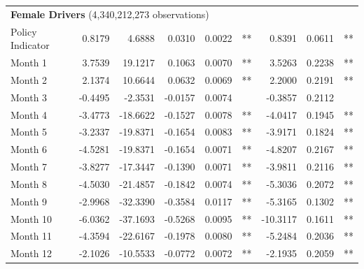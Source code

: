 \documentclass{cje}
\begin{document}
\begin{table}
\begin{tabular}{l r r r r l r r l}
\hline 

\multicolumn{7}{l}{\textbf{Female Drivers} (4,340,212,273 observations)} \\ 

Policy Indicator          &  0.8179        &  4.6888       &  0.0310        &  0.0022       &   **       &  0.8391        &  0.0611       &   **       \\ 
Month 1                         &  3.7539        &  19.1217       &  0.1063        &  0.0070       &   **       &  3.5263        &  0.2238       &   **       \\ 
Month 2                         &  2.1374        &  10.6644       &  0.0632        &  0.0069       &   **       &  2.2000        &  0.2191       &   **       \\ 
Month 3                         &  -0.4495        &  -2.3531       &  -0.0157        &  0.0074       &            &  -0.3857        &  0.2112       &            \\ 
Month 4                         &  -3.4773        &  -18.6622       &  -0.1527        &  0.0078       &   **       &  -4.0417        &  0.1945       &   **       \\ 
Month 5                         &  -3.2337        &  -19.8371       &  -0.1654        &  0.0083       &   **       &  -3.9171        &  0.1824       &   **       \\ 
Month 6                         &  -4.5281        &  -19.8371       &  -0.1654        &  0.0071       &   **       &  -4.8207        &  0.2167       &   **       \\ 
Month 7                         &  -3.8277        &  -17.3447       &  -0.1390        &  0.0071       &   **       &  -3.9811        &  0.2116       &   **       \\ 
Month 8                         &  -4.5030        &  -21.4857       &  -0.1842        &  0.0074       &   **       &  -5.3036        &  0.2072       &   **       \\ 
Month 9                         &  -2.9968        &  -32.3390       &  -0.3584        &  0.0117       &   **       &  -5.3165        &  0.1302       &   **       \\ 
Month 10                        &  -6.0362        &  -37.1693       &  -0.5268        &  0.0095       &   **       &  -10.3117        &  0.1611       &   **       \\ 
Month 11                        &  -4.3594        &  -22.6167       &  -0.1978        &  0.0080       &   **       &  -5.2484        &  0.2036       &   **       \\ 
Month 12                        &  -2.1026        &  -10.5533       &  -0.0772        &  0.0072       &   **       &  -2.1935        &  0.2059       &   **       \\ 


\end{tabular}
\end{table}
\end{document}
